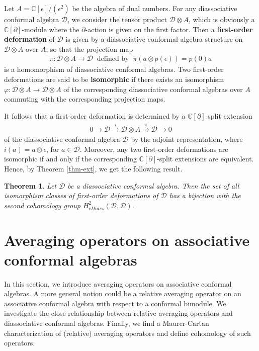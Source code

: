 \documentclass[a4paper,reqno,10pt]{amsart}
\theoremstyle{plain}
\newtheorem{thm}{Theorem}[section]
\theoremstyle{definition}
\theoremstyle{remark}
\newcommand{\C}{\mathbb{C}}
\newcommand{\D}{\mathcal{D}}
\begin{document}
\medskip
   
  Let $A = \C [\epsilon] / (\epsilon^2 )$ be the algebra of dual numbers. For any diassociative conformal algebra $\D$, we consider the tensor product $\D \otimes A$, which is obviously a $\C [\partial]$-module where the $\partial$-action is given on the first factor. Then a {\bf first-order deformation} of $\D$ is given by a diassociative conformal algebra structure on $\D \otimes A$ over $A$, so that the projection map
 \begin{align*}
    \pi: \D \otimes A \rightarrow \D ~\text{ defined by }~ \pi (a \otimes p (\epsilon) ) = p (0) a
 \end{align*}
 is a homomorphism of diassociative conformal algebras. Two first-order deformations are said to be {\bf isomorphic} if there exists an isomorphism $\varphi: \D \otimes A \rightarrow \D \otimes A$ of the corresponding diassociative conformal algebras over $A$ commuting with the corresponding projection maps.

 It follows that a first-order deformation is determined by a $\C[\partial]$-split extension
 \begin{align*}0\longrightarrow
\D
\xrightarrow{\ i \ }
\D \otimes A
\xrightarrow{\ \pi\ }
\D
\longrightarrow 0
\end{align*}
of the diassociative conformal algebra $\D$ by the adjoint representation, where $i (a) = a \otimes \epsilon$, for $a \in \D$. Moreover, any two first-order deformations are isomorphic if and only if the corresponding $\C[\partial]$-split extensions are equivalent. Hence, by Theorem \ref{thm-ext}, we get the following result.

\begin{thm}\label{thm-def}
    Let $\D$ be a diassociative conformal algebra. Then the set of all isomorphism classes of first-order deformations of $\D$ has a bijection with the second cohomology group $H^2_{cDiass} (\D, \D).$
\end{thm}


\section{Averaging operators on associative conformal algebras}\label{sec5}

In this section, we introduce averaging operators on associative conformal algebras. A more general notion could be a relative averaging operator on an associative conformal algebra with respect to a conformal bimodule. We investigate the close relationship between relative averaging operators and diassociative conformal algebras. Finally, we find a Maurer-Cartan characterization of (relative) averaging operators and define cohomology of such operators.
\end{document}
